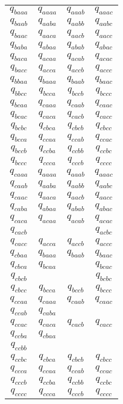 \begin{enumerate}
\begin{latin}
\begin{longtable}{c|ccc}
$q_{baaa}$ & $q_{aaaa}$ & $q_{aaab}$ & $q_{aaac}$ \\
$q_{baab}$ & $q_{aaba}$ & $q_{aabb}$ & $q_{aabc}$ \\
$q_{baac}$ & $q_{aaca}$ & $q_{aacb}$ & $q_{aacc}$ \\
$q_{baba}$ & $q_{abaa}$ & $q_{abab}$ & $q_{abac}$ \\
$q_{baca}$ & $q_{acaa}$ & $q_{acab}$ & $q_{acac}$ \\
$q_{bacc}$ & $q_{acca}$ & $q_{accb}$ & $q_{accc}$ \\
$q_{bbaa}$ & $q_{baaa}$ & $q_{baab}$ & $q_{baac}$ \\
$q_{bbcc}$ & $q_{bcca}$ & $q_{bccb}$ & $q_{bccc}$ \\
$q_{bcaa}$ & $q_{caaa}$ & $q_{caab}$ & $q_{caac}$ \\
$q_{bcac}$ & $q_{caca}$ & $q_{cacb}$ & $q_{cacc}$ \\
$q_{bcbc}$ & $q_{cbca}$ & $q_{cbcb}$ & $q_{cbcc}$ \\
$q_{bcca}$ & $q_{ccaa}$ & $q_{ccab}$ & $q_{ccac}$ \\
$q_{bccb}$ & $q_{ccba}$ & $q_{ccbb}$ & $q_{ccbc}$ \\
$q_{bccc}$ & $q_{ccca}$ & $q_{cccb}$ & $q_{cccc}$ \\
$q_{caaa}$ & $q_{aaaa}$ & $q_{aaab}$ & $q_{aaac}$ \\
$q_{caab}$ & $q_{aaba}$ & $q_{aabb}$ & $q_{aabc}$ \\
$q_{caac}$ & $q_{aaca}$ & $q_{aacb}$ & $q_{aacc}$ \\
$q_{caba}$ & $q_{abaa}$ & $q_{abab}$ & $q_{abac}$ \\
$q_{caca}$ & $q_{acaa}$ & $q_{acab}$ & $q_{acac}$ \\
$q_{cacb}$ &  &  & $q_{acbc}$ \\
$q_{cacc}$ & $q_{acca}$ & $q_{accb}$ & $q_{accc}$ \\
$q_{cbaa}$ & $q_{baaa}$ & $q_{baab}$ & $q_{baac}$ \\
$q_{cbca}$ & $q_{bcaa}$ &  & $q_{bcac}$ \\
$q_{cbcb}$ &  &  & $q_{bcbc}$ \\
$q_{cbcc}$ & $q_{bcca}$ & $q_{bccb}$ & $q_{bccc}$ \\
$q_{ccaa}$ & $q_{caaa}$ & $q_{caab}$ & $q_{caac}$ \\
$q_{ccab}$ & $q_{caba}$ &  &  \\
$q_{ccac}$ & $q_{caca}$ & $q_{cacb}$ & $q_{cacc}$ \\
$q_{ccba}$ & $q_{cbaa}$ &  &  \\
$q_{ccbb}$ &  &  &  \\
$q_{ccbc}$ & $q_{cbca}$ & $q_{cbcb}$ & $q_{cbcc}$ \\
$q_{ccca}$ & $q_{ccaa}$ & $q_{ccab}$ & $q_{ccac}$ \\
$q_{cccb}$ & $q_{ccba}$ & $q_{ccbb}$ & $q_{ccbc}$ \\
$q_{cccc}$ & $q_{ccca}$ & $q_{cccb}$ & $q_{cccc}$ \\
    \end{longtable}
    \end{latin}
\end{enumerate}
